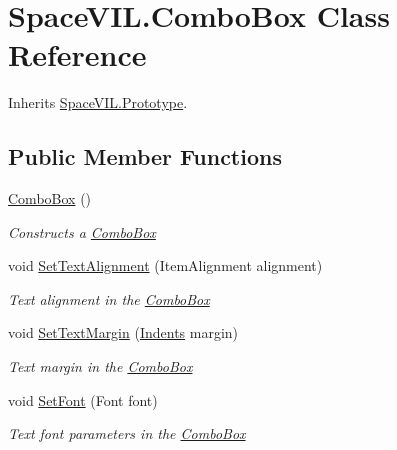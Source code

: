 \hypertarget{class_space_v_i_l_1_1_combo_box}{}\section{Space\+V\+I\+L.\+Combo\+Box Class Reference}
\label{class_space_v_i_l_1_1_combo_box}


Inherits \mbox{\hyperlink{class_space_v_i_l_1_1_prototype}{Space\+V\+I\+L.\+Prototype}}.

\subsection*{Public Member Functions}
\begin{DoxyCompactItemize}
\item 
\mbox{\hyperlink{class_space_v_i_l_1_1_combo_box_a5d981f81824ff870fa91043c93394f68}{Combo\+Box}} ()
\begin{DoxyCompactList}\small\item\em Constructs a \mbox{\hyperlink{class_space_v_i_l_1_1_combo_box}{Combo\+Box}} \end{DoxyCompactList}\item 
void \mbox{\hyperlink{class_space_v_i_l_1_1_combo_box_a43bcc26da1d80a462c541aea0a830b56}{Set\+Text\+Alignment}} (Item\+Alignment alignment)
\begin{DoxyCompactList}\small\item\em Text alignment in the \mbox{\hyperlink{class_space_v_i_l_1_1_combo_box}{Combo\+Box}} \end{DoxyCompactList}\item 
void \mbox{\hyperlink{class_space_v_i_l_1_1_combo_box_ad770a207c2e8525603e55f584605299b}{Set\+Text\+Margin}} (\mbox{\hyperlink{struct_space_v_i_l_1_1_decorations_1_1_indents}{Indents}} margin)
\begin{DoxyCompactList}\small\item\em Text margin in the \mbox{\hyperlink{class_space_v_i_l_1_1_combo_box}{Combo\+Box}} \end{DoxyCompactList}\item 
void \mbox{\hyperlink{class_space_v_i_l_1_1_combo_box_a6054da3f7eb5440ba249ab2d15128dc9}{Set\+Font}} (Font font)
\begin{DoxyCompactList}\small\item\em Text font parameters in the \mbox{\hyperlink{class_space_v_i_l_1_1_combo_box}{Combo\+Box}} \end{DoxyCompactList}\item 

\end{DoxyCompactItemize}
